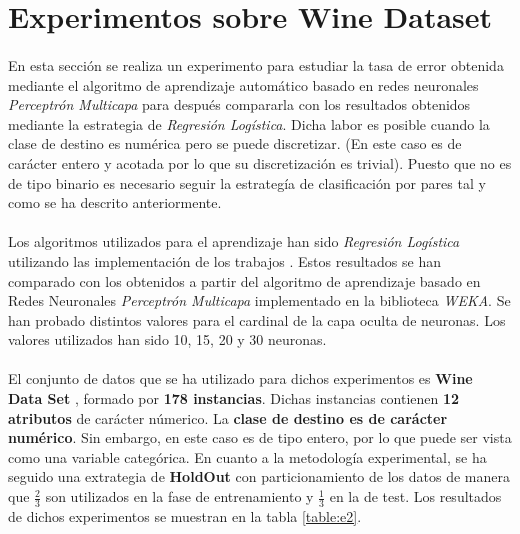 \documentclass{article}
\begin{document}
	\section{Experimentos sobre Wine Dataset}
	\label{sec:e2}

		\paragraph{}
		En esta sección se realiza un experimento para estudiar la tasa de error obtenida mediante el algoritmo de aprendizaje automático basado en redes neuronales \emph{Perceptrón Multicapa} para después compararla con los resultados obtenidos mediante la estrategia de \emph{Regresión Logística}. Dicha labor es posible cuando la clase de destino es numérica pero se puede discretizar. (En este caso es de carácter entero y acotada por lo que su discretización es trivial). Puesto que no es de tipo binario es necesario seguir la estrategía de clasificación por pares tal y como se ha descrito anteriormente.

		\paragraph{}
		Los algoritmos utilizados para el aprendizaje han sido \emph{Regresión Logística} utilizando las implementación de los trabajos \cite{garciparedes:machine-learning-regression}. Estos resultados se han comparado con los obtenidos a partir del algoritmo de aprendizaje basado en Redes Neuronales \emph{Perceptrón Multicapa} implementado en la biblioteca \emph{WEKA}\cite{tool:weka}. Se han probado distintos valores para el cardinal de la capa oculta de neuronas. Los valores utilizados han sido 10, 15, 20 y 30 neuronas.

		\paragraph{}
		El conjunto de datos que se ha utilizado para dichos experimentos es \textbf{Wine Data Set} \cite{dataset:wine}, formado por \textbf{178 instancias}. Dichas instancias contienen \textbf{12 atributos} de carácter númerico. La \textbf{clase de destino es de carácter numérico}. Sin embargo, en este caso es de tipo entero, por lo que puede ser vista como una variable categórica. En cuanto a la metodología experimental, se ha seguido una extrategia de \textbf{HoldOut} con particionamiento de los datos de manera que $\frac{2}{3}$ son utilizados en la fase de entrenamiento y $\frac{1}{3}$ en la de test. Los resultados de dichos experimentos se muestran en la tabla \ref{table:e2}.
\end{document}
